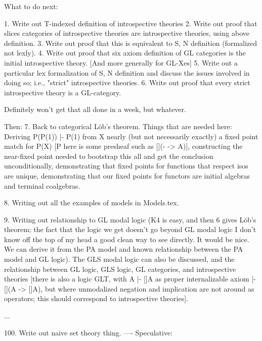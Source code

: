 What to do next:

1. Write out T-indexed definition of introspective theories
2. Write out proof that slices categories of introspective theories are introspective theories, using above definition.
3. Write out proof that this is equivalent to S, N definition (formalized not lexly).
4. Write out proof that six axiom definition of GL categories is the initial introspective theory. [And more generally for GL-Xes]
5. Write out a particular lex formalization of S, N definition and discuss the issues involved in doing so; i.e., "strict" introspective theories.
6. Write out proof that every strict introspective theory is a GL-category.

Definitely won't get that all done in a week, but whatever.

Then:
7. Back to categorical Löb's theorem. Things that are needed here: Deriving P(P(1)) |- P(1) from X nearly (but not necessarily exactly) a fixed point match for P(X) [P here is some presheaf such as [](- -> A)], constructing the near-fixed point needed to bootstrap this all and get the conclusion unconditionally, demonstrating that fixed points for functions that respect isos are unique, demonstrating that our fixed points for functors are initial algebras and terminal coalgebras.

8. Writing out all the examples of models in Models.tex.

9. Writing out relationship to GL modal logic (K4 is easy, and then 6 gives Löb's theorem; the fact that the logic we get doesn't go beyond GL modal logic I don't know off the top of my head a good clean way to see directly. It would be nice. We can derive it from the PA model and known relationship between the PA model and GL logic). The GLS modal logic can also be discussed, and the relationship between GL logic, GLS logic, GL categories, and introspective theories [there is also a logic GLT, with A |- []A as proper internalizable axiom |- [](A -> []A), but where unmodalized negation and implication are not around as operators; this should correspond to introspective theories].

...

100. Write out naive set theory thing.
----
Speculative:

